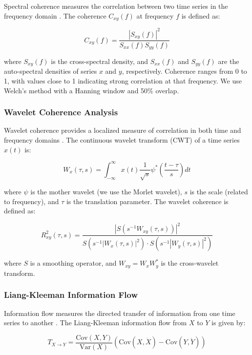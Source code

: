 \documentclass[12pt,a4paper,twocolumn]{article}
\begin{document}
Spectral coherence measures the correlation between two time series in the frequency domain \citep{grinsted2004}. The coherence $C_{xy}(f)$ at frequency $f$ is defined as:

\begin{equation}
C_{xy}(f) = \frac{|S_{xy}(f)|^2}{S_{xx}(f) S_{yy}(f)}
\end{equation}

where $S_{xy}(f)$ is the cross-spectral density, and $S_{xx}(f)$ and $S_{yy}(f)$ are the auto-spectral densities of series $x$ and $y$, respectively. Coherence ranges from 0 to 1, with values close to 1 indicating strong correlation at that frequency. We use Welch's method with a Hanning window and 50\% overlap.

\subsubsection{Wavelet Coherence Analysis}

Wavelet coherence provides a localized measure of correlation in both time and frequency domains \citep{torrence1998}. The continuous wavelet transform (CWT) of a time series $x(t)$ is:

\begin{equation}
W_x(\tau, s) = \int_{-\infty}^{\infty} x(t) \frac{1}{\sqrt{s}} \psi^*\left(\frac{t-\tau}{s}\right) dt
\end{equation}

where $\psi$ is the mother wavelet (we use the Morlet wavelet), $s$ is the scale (related to frequency), and $\tau$ is the translation parameter. The wavelet coherence is defined as:

\begin{equation}
R_{xy}^2(\tau, s) = \frac{|S(s^{-1} W_{xy}(\tau, s))|^2}{S(s^{-1} |W_x(\tau, s)|^2) \cdot S(s^{-1} |W_y(\tau, s)|^2)}
\end{equation}

where $S$ is a smoothing operator, and $W_{xy} = W_x W_y^*$ is the cross-wavelet transform.

\subsubsection{Liang-Kleeman Information Flow}

Information flow measures the directed transfer of information from one time series to another \citep{liang2016}. The Liang-Kleeman information flow from $X$ to $Y$ is given by:

\begin{equation}
T_{X \to Y} = \frac{\text{Cov}(X, Y)}{\text{Var}(X)} \left( \text{Cov}(X, \dot{X}) - \text{Cov}(Y, \dot{Y}) \right)
\end{equation}
\end{document}

